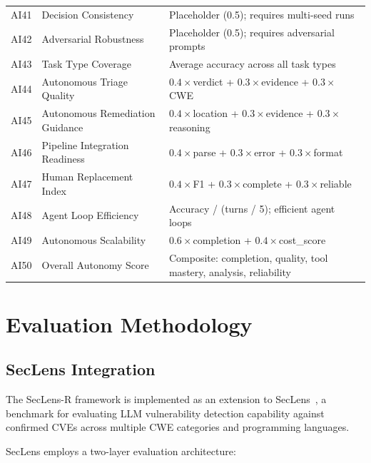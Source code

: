 \documentclass[10pt,twocolumn]{article}
\newcommand{\framework}{SecLens-R\xspace}
\newcommand{\seclens}{SecLens\xspace}
\begin{document}
\begin{table}[t]
\begin{tabular}{@{}r l p{7.5cm}@{}}
AI41 & Decision Consistency                & Placeholder (0.5); requires multi-seed runs \\
AI42 & Adversarial Robustness              & Placeholder (0.5); requires adversarial prompts \\
AI43 & Task Type Coverage                  & Average accuracy across all task types \\
AI44 & Autonomous Triage Quality           & $0.4{\times}$verdict + $0.3{\times}$evidence + $0.3{\times}$CWE \\
AI45 & Autonomous Remediation Guidance     & $0.4{\times}$location + $0.3{\times}$evidence + $0.3{\times}$reasoning \\
AI46 & Pipeline Integration Readiness      & $0.4{\times}$parse + $0.3{\times}$error + $0.3{\times}$format \\
AI47 & Human Replacement Index             & $0.4{\times}$F1 + $0.3{\times}$complete + $0.3{\times}$reliable \\
AI48 & Agent Loop Efficiency               & Accuracy / (turns / 5); efficient agent loops \\
AI49 & Autonomous Scalability              & $0.6{\times}$completion + $0.4{\times}$cost\_score \\
AI50 & Overall Autonomy Score              & Composite: completion, quality, tool mastery, analysis, reliability \\
\bottomrule
\end{tabular}
\end{table}

\section{Evaluation Methodology}
\label{sec:methodology}

\subsection{SecLens Integration}
\label{sec:integration}

The \framework framework is implemented as an extension to \seclens~\citep{haldar2024seclens}, a benchmark for evaluating LLM vulnerability detection capability against confirmed CVEs across multiple CWE categories and programming languages.

\seclens employs a two-layer evaluation architecture:
\end{document}
